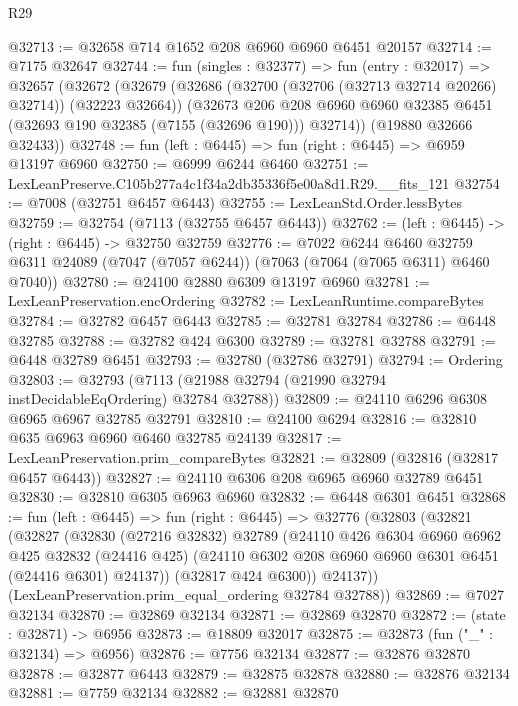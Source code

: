 \begin{lexlean}{R29}
\begin{coremodule}
@32713 := @32658 @714 @1652 @208 @6960 @6960 @6451 @20157
@32714 := @7175 @32647
@32744 := fun (singles : @32377) =>
  fun (entry : @32017) =>
  @32657
    (@32672
      (@32679
        (@32686 (@32700 (@32706 (@32713 @32714 @20266) @32714)) (@32223 @32664))
        (@32673
          @206
          @208
          @6960
          @6960
          @32385
          @6451
          (@32693 @190 @32385 (@7155 (@32696 @190)))
          @32714))
      (@19880 @32666 @32433))
@32748 := fun (left : @6445) => fun (right : @6445) => @6959 @13197 @6960
@32750 := @6999 @6244 @6460
@32751 := LexLeanPreserve.C105b277a4c1f34a2db35336f5e00a8d1.R29.__fits_121
@32754 := @7008 (@32751 @6457 @6443)
@32755 := LexLeanStd.Order.lessBytes
@32759 := @32754 (@7113 (@32755 @6457 @6443))
@32762 := (left : @6445) -> (right : @6445) -> @32750 @32759
@32776 := @7022
    @6244
    @6460
    @32759
    @6311
    @24089
    (@7047 (@7057 @6244))
    (@7063 (@7064 (@7065 @6311) @6460 @7040))
@32780 := @24100 @2880 @6309 @13197 @6960
@32781 := LexLeanPreservation.encOrdering
@32782 := LexLeanRuntime.compareBytes
@32784 := @32782 @6457 @6443
@32785 := @32781 @32784
@32786 := @6448 @32785
@32788 := @32782 @424 @6300
@32789 := @32781 @32788
@32791 := @6448 @32789 @6451
@32793 := @32780 (@32786 @32791)
@32794 := Ordering
@32803 := @32793 (@7113 (@21988 @32794 (@21990 @32794 instDecidableEqOrdering) @32784 @32788))
@32809 := @24110 @6296 @6308 @6965 @6967 @32785 @32791
@32810 := @24100 @6294
@32816 := @32810 @635 @6963 @6960 @6460 @32785 @24139
@32817 := LexLeanPreservation.prim_compareBytes
@32821 := @32809 (@32816 (@32817 @6457 @6443))
@32827 := @24110 @6306 @208 @6965 @6960 @32789 @6451
@32830 := @32810 @6305 @6963 @6960
@32832 := @6448 @6301 @6451
@32868 := fun (left : @6445) =>
  fun (right : @6445) =>
  @32776
    (@32803
      (@32821
        (@32827
          (@32830
            (@27216 @32832)
            @32789
            (@24110
              @426
              @6304
              @6960
              @6962
              @425
              @32832
              (@24416 @425)
              (@24110 @6302 @208 @6960 @6960 @6301 @6451 (@24416 @6301) @24137))
            (@32817 @424 @6300))
          @24137))
      (LexLeanPreservation.prim_equal_ordering @32784 @32788))
@32869 := @7027 @32134
@32870 := @32869 @32134
@32871 := @32869 @32870
@32872 := (state : @32871) -> @6956
@32873 := @18809 @32017
@32875 := @32873 (fun ("_" : @32134) => @6956)
@32876 := @7756 @32134
@32877 := @32876 @32870
@32878 := @32877 @6443
@32879 := @32875 @32878
@32880 := @32876 @32134
@32881 := @7759 @32134
@32882 := @32881 @32870

\end{coremodule}
\end{lexlean}
